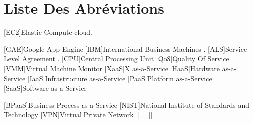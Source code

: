  
 \chapter*{Liste Des Abréviations}
 \begin{acronym}
 [EC2]{Elastic Compute cloud}.
 	
 	
  	[GAE]{Google App Engine}	
 	[IBM]{International Business Machines}	 .
 	[ALS]{Service Level Agreement} .	 
  	[CPU]{Central Processing Unit}	
    [QoS]{Quality Of Service}	 
    [VMM]{Virtual Machine Monitor}  
	[XaaS]{X as-a-Service}	
    	[HaaS]{Hardware as-a-Service}	
    		{Infrastructure as-a-Service}	
    			[PaaS]{Platform as-a-Service}	
    				[SaaS]{Software as-a-Service}	
    
    [BPaaS]{Business Process as-a-Service}	 
    [NIST]{National Institute of Standards and Technology} 	
 	  [VPN]{Virtual Private Network}
 	  \acro{}[]{}
 	  \acro{}[]{}
 	  \acro{}[]{}
 \end{acronym}
 